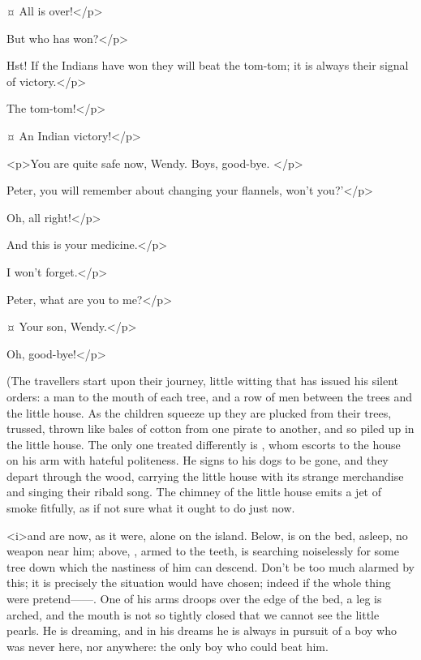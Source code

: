\begin{drama}
\peterspeaks {}¤
All is over!</p>

\wendyspeaks
But who has won?</p>

\peterspeaks
Hst!
If the Indians have won they will beat the tom-tom; it is always their signal of victory.</p>


\tootlesspeaks
The tom-tom!</p>

\peterspeaks {}¤
An Indian victory!</p>


<p>You are quite safe now, Wendy.
Boys, good-bye.
</p>

\wendyspeaks
Peter, you will remember about changing your flannels, won't you?'</p>

\peterspeaks
Oh, all right!</p>

\wendyspeaks
And this is your medicine.</p>


\peterspeaks
I won't forget.</p>

\wendyspeaks
Peter, what are you to me?</p>

\peterspeaks {}¤
Your son, Wendy.</p>

\wendyspeaks
Oh, good-bye!</p>

\begin{stagedir}
(The travellers start upon their journey, little witting that \hook has issued his silent orders:
a man to the mouth of each tree, and a row of men between the trees and the little house.
As the children squeeze up they are plucked from their trees,
trussed, thrown like bales of cotton from one pirate to another, and so piled up in the little house.
The only one treated differently is \wendy, whom \hook escorts to the house on his arm with hateful politeness.
He signs to his dogs to be gone, and they depart through the wood,
carrying the little house with its strange merchandise and singing their ribald song.
The chimney of the little house emits a jet of smoke fitfully, as if not sure what it ought to do just now.

\hook <i>and \peter are now, as it were, alone on the island.
Below, \peter is on the bed, asleep, no weapon near him;
above, \hook, armed to the teeth, is searching noiselessly for some tree down which the nastiness of him can descend.
Don't be too much alarmed by this; it is precisely the situation \peter would have chosen;
indeed if the whole thing were pretend——.
One of his arms droops over the edge of the bed, a leg is arched,
and the mouth is not so tightly closed that we cannot see the little pearls.
He is dreaming, and in his dreams he is always in pursuit of a boy who was never here, nor anywhere:
the only boy who could beat him.


\end{stagedir}
\end{drama}
